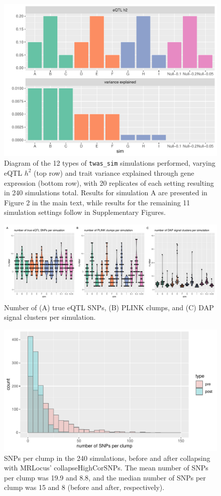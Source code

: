 \documentclass[11pt]{article}
\begin{document}
\begin{figure}[!ht]
  \centering
  \includegraphics[width=.7\textwidth]{figs/sim_types}
  \caption{Diagram of the 12 types of \texttt{twas\_sim} simulations
    performed, varying eQTL $h^2$ (top row) and trait variance explained
    through gene expression (bottom row), with 20 replicates of each
    setting resulting in 240 simulations total. Results for simulation
    A are presented in Figure 2 in the main text, while results for
    the remaining 11 simulation settings follow in Supplementary
    Figures.}
\end{figure}

\begin{figure}[!ht]
  \centering
  \includegraphics[width=\textwidth]{figs/sim_details}
  \caption{Number of (A) true eQTL SNPs, (B) PLINK clumps, and (C) DAP
    signal clusters per simulation.}
\end{figure}

\begin{figure}[!ht]
  \centering
  \includegraphics[width=.7\textwidth]{figs/snps-per-clump}
  \caption{SNPs per clump in the 240 simulations, before and after
    collapsing with MRLocus’ collapseHighCorSNPs. The mean number of
    SNPs per clump was 19.9 and 8.8, and the median number of SNPs per
    clump was 15 and 8 (before and after, respectively).} 
\end{figure}
\end{document}
